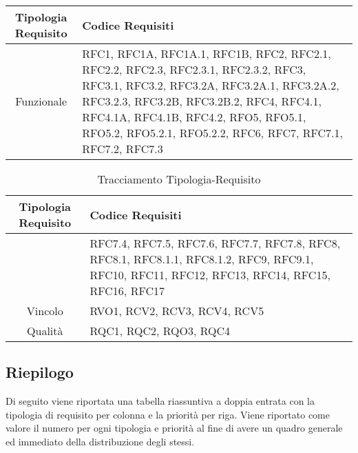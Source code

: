 \begin{table}[!htbp] %
            \centering
            \renewcommand{\arraystretch}{2} %
            \begin{tabular}{|c|p{2cm}|} %
                \rowcolor{orange!50} %
        		\hline
        		\textbf{Tipologia Requisito} & \textbf{Codice Requisiti} \\
                \hline
                Funzionale & RFC1, RFC1A, RFC1A.1, RFC1B, RFC2, RFC2.1, RFC2.2, RFC2.3, RFC2.3.1, RFC2.3.2, RFC3, RFC3.1, RFC3.2, RFC3.2A, RFC3.2A.1, RFC3.2A.2, RFC3.2.3, RFC3.2B, RFC3.2B.2, RFC4, RFC4.1, RFC4.1A, RFC4.1B, RFC4.2, RFO5, RFO5.1, RFO5.2, RFO5.2.1, RFO5.2.2, RFC6, RFC7, RFC7.1, RFC7.2, RFC7.3 \\
                \hline
            \end{tabular}
\end{table}
\begin{table}[!htbp] %
            \centering
            \renewcommand{\arraystretch}{2} %
            \begin{tabular}{|c|p{2cm}|} %
                \rowcolor{orange!50} %
        		\hline
        		\textbf{Tipologia Requisito} & \textbf{Codice Requisiti} \\
                \hline
                & RFC7.4, RFC7.5, RFC7.6, RFC7.7, RFC7.8, RFC8, RFC8.1, RFC8.1.1, RFC8.1.2, RFC9, RFC9.1, RFC10, RFC11, RFC12, RFC13, RFC14, RFC15, RFC16, RFC17 \\
                \hline
                Vincolo & RVO1, RCV2, RCV3, RCV4, RCV5\\
                \hline
                Qualità & RQC1, RQC2, RQO3, RQC4\\
                \hline
        \end{tabular}
        \caption{Tracciamento Tipologia-Requisito} %
\end{table}

\newpage
\subsection{Riepilogo}
Di seguito viene riportata una tabella riassuntiva a doppia entrata con la tipologia di requisito per colonna e la priorità per riga. Viene riportato come valore il numero per ogni tipologia e priorità al fine di avere un quadro generale ed immediato della distribuzione degli stessi.


